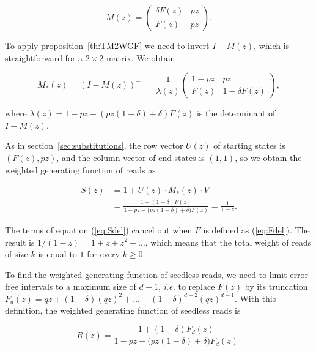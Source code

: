 \documentclass{article}
\begin{document}
\begin{equation*}
M(z) = \left(
\begin{matrix}
\delta F(z) & pz \\
F(z)        & pz
\end{matrix}
\right).
\end{equation*}

To apply proposition~\ref{th:TM2WGF} we need to invert $I-M(z)$, which is
straightforward for a $2 \times 2$ matrix. We obtain

\begin{equation*}
M_*(z) = (I-M(z))^{-1}=
\frac{1}{\lambda(z)}
\left(
\begin{matrix}
1-pz  & pz              \\
F(z) & 1 -\delta F(z)
\end{matrix}
\right),
\end{equation*}

\noindent
where $\lambda(z) = 1-pz-(pz(1-\delta)+\delta)F(z)$ is the determinant of
$I-M(z)$.

As in section~\ref{sec:substitutions}, the row vector $U(z)$ of starting
states is $(F(z), pz)$, and the column vector of end states is $(1,1)$, so
we obtain the weighted generating function of reads as

\begin{equation}
\label{eq:Sdel}
\begin{split}
S(z) &= 1 + U(z) \cdot M_*(z) \cdot V \\
&= \frac{1+(1-\delta)F(z)} {1-pz - \big(pz(1-\delta) + \delta\big)F(z)}
= \frac{1}{1-z}.
\end{split}
\end{equation}

The terms of equation (\ref{eq:Sdel}) cancel out when $F$ is defined as
(\ref{eq:Fdel}). The result is $1/(1-z) = 1+z +z^2 + \ldots$, which means
that the total weight of reads of size $k$ is equal to $1$ for every $k
\geq 0$.

To find the weighted generating function of seedless reads, we need to
limit error-free intervals to a maximum size of $d-1$, \textit{i.e.} to
replace $F(z)$ by its truncation $F_d(z) = qz + (1-\delta)(qz)^2 + \ldots
+ (1-\delta)^{d-2}(qz)^{d-1}$. With this definition, the weighted
generating function of seedless reads is

\begin{equation}
\label{eq:Sdel}
R(z) = \frac{1+(1-\delta)F_d(z)}
  {1-pz - \big(pz(1-\delta) + \delta\big)F_d(z)}.
\end{equation}
\end{document}

